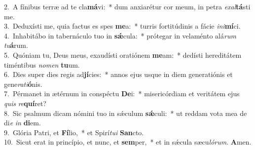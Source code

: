 {2.~}A fínibus terræ ad te cla\textbf{má}vi:~* dum anxiarétur cor meum, in petra \textit{e}\textit{xal}\textbf{tá}sti me.\\
{3.~}Deduxísti me, quia factus es spes \textbf{me}a:~* turris fortitúdinis a fácie \textit{i}\textit{ni}\textbf{mí}ci.\\
{4.~}Inhabitábo in tabernáculo tuo in \textbf{sǽ}cula:~* prótegar in velaménto alá\textit{rum} \textit{tu}\textbf{á}rum.\\
{5.~}Quóniam tu, Deus meus, exaudísti oratiónem \textbf{me}am:~* dedísti hereditátem timéntibus \textit{no}\textit{men} \textbf{tu}um.\\
{6.~}Dies super dies regis ad\textbf{jí}cies:~* annos ejus usque in diem generatiónis et gene\textit{ra}\textit{ti}\textbf{ó}nis.\\
{7.~}Pérmanet in ætérnum in conspéctu \textbf{De}i:~* misericórdiam et veritátem ejus \textit{quis} \textit{re}\textbf{quí}ret?\\
{8.~}Sic psalmum dicam nómini tuo in sǽculum \textbf{sǽ}culi:~* ut reddam vota mea de di\textit{e} \textit{in} \textbf{di}em.\\
{9.~}Glória Patri, et \textbf{Fí}lio,~* et Spirí\textit{tu}\textit{i} \textbf{San}cto.\\
{10.~}Sicut erat in princípio, et nunc, et \textbf{sem}per,~* et in sǽcula sæcu\textit{ló}\textit{rum}. \textbf{A}men.\\
